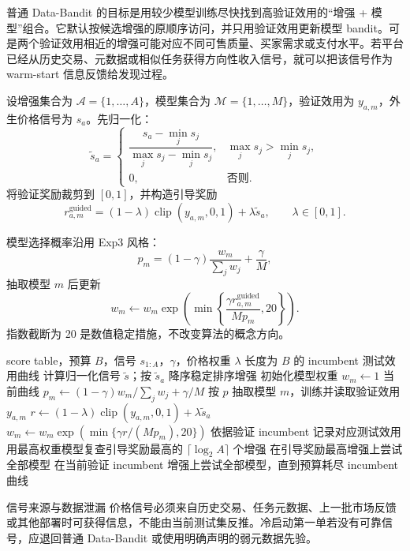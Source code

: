 \documentclass[11pt,a4paper]{ctexart}
\begin{document}
普通 Data-Bandit 的目标是用较少模型训练尽快找到高验证效用的“增强 + 模型”组合。它默认按候选增强的原顺序访问，并只用验证效用更新模型 bandit。可是两个验证效用相近的增强可能对应不同可售质量、买家需求或支付水平。若平台已经从历史交易、元数据或相似任务获得方向性收入信号，就可以把该信号作为 warm-start 信息反馈给发现过程。

设增强集合为 $\mathcal A=\{1,\ldots,A\}$，模型集合为
$\mathcal M=\{1,\ldots,M\}$，验证效用为 $y_{a,m}$，外生价格信号为
$s_a$。先归一化：
\[
\widetilde s_a=
\begin{cases}
\dfrac{s_a-\min_j s_j}{\max_j s_j-\min_j s_j},
&\max_j s_j>\min_j s_j,\\[8pt]
0,&\text{否则}.
\end{cases}
\]
将验证奖励裁剪到 $[0,1]$，并构造引导奖励
\[
r_{a,m}^{\mathrm{guided}}
=(1-\lambda)\operatorname{clip}(y_{a,m},0,1)
+\lambda\widetilde s_a,\qquad \lambda\in[0,1].
\]

模型选择概率沿用 Exp3 风格：
\[
p_m=(1-\gamma)\frac{w_m}{\sum_jw_j}+\frac{\gamma}{M},
\]
抽取模型 $m$ 后更新
\[
w_m\leftarrow w_m
\exp\left(
\min\left\{
\frac{\gamma r_{a,m}^{\mathrm{guided}}}{Mp_m},20
\right\}
\right).
\]
指数截断为 20 是数值稳定措施，不改变算法的概念方向。

\begin{algorithm}[H]
\caption{Pricing-guided Data-Bandit}
\begin{algorithmic}[1]
\Require score table，预算 $B$，信号 $s_{1:A}$，$\gamma$，价格权重 $\lambda$
\Ensure 长度为 $B$ 的 incumbent 测试效用曲线
\State 计算归一化信号 $\widetilde s$；按 $\widetilde s_a$ 降序稳定排序增强
\State 初始化模型权重 $w_m\gets1$
  \State \Return 当前曲线\EndIf
  \State $p_m\gets(1-\gamma)w_m/\sum_jw_j+\gamma/M$
  \State 按 $p$ 抽取模型 $m$，训练并读取验证效用 $y_{a,m}$
  \State $r\gets(1-\lambda)\operatorname{clip}(y_{a,m},0,1)+\lambda\widetilde s_a$
  \State $w_m\gets w_m\exp(\min\{\gamma r/(Mp_m),20\})$
  \State 依据验证 incumbent 记录对应测试效用
\EndFor
\State 用最高权重模型复查引导奖励最高的 $\lceil\log_2A\rceil$ 个增强
\State 在引导奖励最高增强上尝试全部模型
\State 在当前验证 incumbent 增强上尝试全部模型，直到预算耗尽
\State \Return incumbent 曲线
\end{algorithmic}
\end{algorithm}

\begin{boundarybox}{信号来源与数据泄漏}
价格信号必须来自历史交易、任务元数据、上一批市场反馈或其他部署时可获得信息，不能由当前测试集反推。冷启动第一单若没有可靠信号，应退回普通 Data-Bandit 或使用明确声明的弱元数据先验。
\end{boundarybox}
\end{document}
